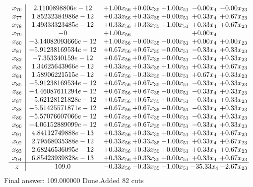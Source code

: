 \documentclass[8pt]{article}
\begin{document}
\[\begin{array}{c| c c@{\hskip 2pt} c@{\hskip 2pt} c@{\hskip 2pt} c@{\hskip 2pt} c@{\hskip 2pt} }
 x_{76}   &  2.1100898806e-12 & +  1.00 x_{56} & +  0.00 x_{35} & +  1.00 x_{51} & -0.00 x_{4} & -0.00 x_{23}\\
 x_{77}   &  1.85232384986e-12 & +  0.33 x_{56} & +  0.33 x_{35} & +  0.00 x_{51} & +  0.33 x_{4} & +  0.67 x_{23}\\
 x_{78}   &  1.49333323485e-12 & +  0.33 x_{56} & +  0.33 x_{35} & +  1.00 x_{51} & +  0.33 x_{4} & +  0.67 x_{23}\\
 x_{79}   &  -0 & +  1.00 x_{56} &    &   & +  0.00 x_{4} &   \\
 x_{80}   &  -3.14082093666e-12 & +  1.00 x_{56} & -0.00 x_{35} & -0.00 x_{51} & +  0.00 x_{4} & +  0.00 x_{23}\\
 x_{81}   &  -5.91238169534e-12 & +  0.67 x_{56} & +  0.67 x_{35} & -0.00 x_{51} & -0.33 x_{4} & +  0.33 x_{23}\\
 x_{82}   &  -7.353340159e-12 & +  0.67 x_{56} & +  0.67 x_{35} & +  0.00 x_{51} & -0.33 x_{4} & +  0.33 x_{23}\\
 x_{83}   &  1.34625643966e-12 & +  0.33 x_{56} & +  0.33 x_{35} & +  1.00 x_{51} & +  0.33 x_{4} & +  0.67 x_{23}\\
 x_{84}   &  1.58906221515e-12 & +  0.67 x_{56} & -0.33 x_{35} & +  0.00 x_{51} & +  0.67 x_{4} & +  0.33 x_{23}\\
 x_{85}   &  -5.91238169534e-12 & +  0.67 x_{56} & +  0.67 x_{35} & -0.00 x_{51} & -0.33 x_{4} & +  0.33 x_{23}\\
 x_{86}   &  -4.46087611294e-12 & +  0.67 x_{56} & +  0.67 x_{35} & -0.00 x_{51} & -0.33 x_{4} & +  0.33 x_{23}\\
 x_{87}   &  -5.62128121828e-12 & +  0.67 x_{56} & +  0.67 x_{35} & +  0.00 x_{51} & -0.33 x_{4} & +  0.33 x_{23}\\
 x_{88}   &  -5.51425571871e-12 & +  0.67 x_{56} & +  0.67 x_{35} & +  0.00 x_{51} & -0.33 x_{4} & +  0.33 x_{23}\\
 x_{89}   &  -5.57076607066e-12 & +  0.67 x_{56} & +  0.67 x_{35} & +  0.00 x_{51} & -0.33 x_{4} & +  0.33 x_{23}\\
 x_{90}   &  -4.06152889099e-12 & +  0.67 x_{56} & +  0.67 x_{35} & +  0.00 x_{51} & -0.33 x_{4} & +  0.33 x_{23}\\
 x_{91}   &  4.84112749888e-13 & +  0.33 x_{56} & +  0.33 x_{35} & +  0.00 x_{51} & +  0.33 x_{4} & +  0.67 x_{23}\\
 x_{92}   &  2.79568035388e-12 & +  0.33 x_{56} & +  0.33 x_{35} & +  1.00 x_{51} & +  0.33 x_{4} & +  0.67 x_{23}\\
 x_{93}   &  2.68246536095e-12 & +  0.33 x_{56} & +  0.33 x_{35} & +  0.00 x_{51} & +  0.33 x_{4} & +  0.67 x_{23}\\
 x_{94}   &  6.85423939828e-13 & +  0.33 x_{56} & +  0.33 x_{35} & +  0.00 x_{51} & +  0.33 x_{4} & +  0.67 x_{23}\\
\hline
z    &  109.0 & -0.33 x_{56} & -0.33 x_{35} & -1.00 x_{51} & -35.33 x_{4} & -2.67 x_{23}\\
\end{array}\]
 Final answer: 109.000000 
Done.Added 82 cuts 
\end{document}
